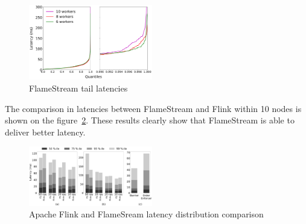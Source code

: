 \begin{figure}[htbp]
  \centering
  \includegraphics[width=0.48\textwidth]{pics/fs-index-quantiles}
  \caption{FlameStream tail latencies}
  \label {fs-index-quantiles}
\end{figure}

The comparison in latencies between FlameStream and Flink within 10 nodes is shown on the figure~\ref{comp-index-quantiles}. These results clearly show that FlameStream is able to deliver better latency.

\begin{figure}[htbp]
  \centering
  \includegraphics[width=0.48\textwidth]{pics/comp-index-quantiles}
  \caption{Apache Flink and FlameSream latency distribution comparison}
  \label {comp-index-quantiles}
\end{figure}
